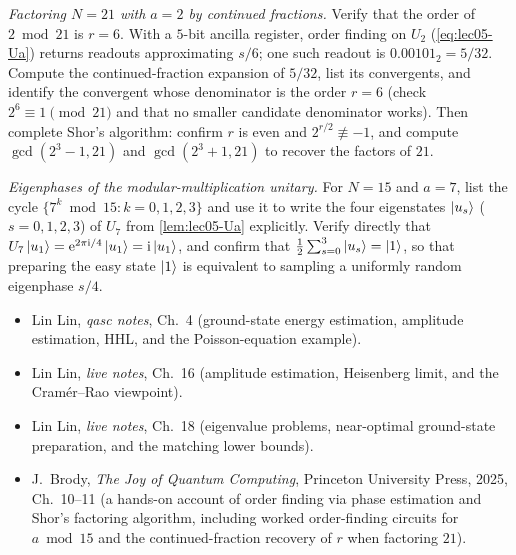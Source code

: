 \begin{exercise}\label{ex:lec05-7}
\emph{Factoring $N=21$ with $a=2$ by continued fractions.} Verify that the order
of $2\bmod 21$ is $r=6$. With a $5$-bit ancilla register, order finding on $U_2$
(\cref{eq:lec05-Ua}) returns readouts approximating $s/6$; one such readout is
$0.00101_2=5/32$. Compute the continued-fraction expansion of $5/32$, list its
convergents, and identify the convergent whose denominator is the order $r=6$
(check $2^{6}\equiv1\pmod{21}$ and that no smaller candidate denominator works).
Then complete Shor's algorithm: confirm $r$ is even and $2^{r/2}\not\equiv-1$, and
compute $\gcd(2^{3}-1,21)$ and $\gcd(2^{3}+1,21)$ to recover the factors of $21$.
\end{exercise}

\begin{exercise}\label{ex:lec05-8}
\emph{Eigenphases of the modular-multiplication unitary.} For $N=15$ and $a=7$,
list the cycle $\{7^{k}\bmod 15:k=0,1,2,3\}$ and use it to write the four
eigenstates $\ket{u_s}$ ($s=0,1,2,3$) of $U_7$ from \cref{lem:lec05-Ua}
explicitly. Verify directly that $U_7\ket{u_1}=\mathrm{e}^{2\pi\mathrm{i}/4}\ket{u_1}=\mathrm{i}\ket{u_1}$,
and confirm that $\tfrac12\sum_{s=0}^{3}\ket{u_s}=\ket{1}$, so that preparing the
easy state $\ket{1}$ is equivalent to sampling a uniformly random eigenphase
$s/4$.
\end{exercise}

\readingsection
\begin{itemize}[leftmargin=1.4em]
  \item Lin Lin, \emph{qasc notes}, Ch.~4 (ground-state energy estimation,
        amplitude estimation, HHL, and the Poisson-equation example).
  \item Lin Lin, \emph{live notes}, Ch.~16 (amplitude estimation, Heisenberg
        limit, and the Cram\'er--Rao viewpoint).
  \item Lin Lin, \emph{live notes}, Ch.~18 (eigenvalue problems, near-optimal
        ground-state preparation, and the matching lower bounds).
  \item J.~Brody, \emph{The Joy of Quantum Computing}, Princeton University
        Press, 2025, Ch.~10--11 (a hands-on account of order finding via phase
        estimation and Shor's factoring algorithm, including worked
        order-finding circuits for $a\bmod 15$ and the continued-fraction
        recovery of $r$ when factoring $21$).
\end{itemize}
